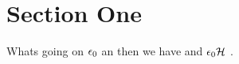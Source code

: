 \section{Section One}

Whats going on $\epsilon_{0}$ an then we have  and $\epsilon_{0}\mathcal{H}$ \cite{kerrisk2010linux}.